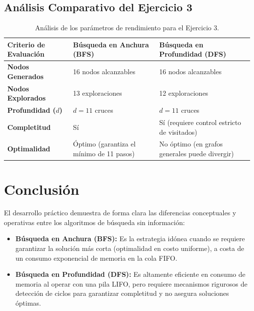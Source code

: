 \documentclass[11pt,letterpaper]{article}
\begin{document}
\subsection{Análisis Comparativo del Ejercicio 3}

\begin{table}[H]
\centering\small
\renewcommand{\arraystretch}{1.2}
\begin{tabularx}{\linewidth}{@{} l X X @{}}
\toprule
\textbf{Criterio de Evaluación} & \textbf{Búsqueda en Anchura (BFS)} & \textbf{Búsqueda en Profundidad (DFS)} \\
\midrule
\textbf{Nodos Generados} & 16 nodos alcanzables & 16 nodos alcanzables \\
\textbf{Nodos Explorados} & 13 exploraciones & 12 exploraciones \\
\textbf{Profundidad ($d$)} & $d = 11$ cruces & $d = 11$ cruces \\
\textbf{Completitud} & Sí & Sí (requiere control estricto de visitados) \\
\textbf{Optimalidad} & Óptimo (garantiza el mínimo de 11 pasos) & No óptimo (en grafos generales puede divergir) \\
\bottomrule
\end{tabularx}
\caption{Análisis de los parámetros de rendimiento para el Ejercicio 3.}
\end{table}

\section{Conclusión}

El desarrollo práctico demuestra de forma clara las diferencias conceptuales y operativas entre los algoritmos de búsqueda sin información:

\begin{itemize}
  \item \textbf{Búsqueda en Anchura (BFS):} Es la estrategia idónea cuando se requiere garantizar la solución más corta (optimalidad en costo uniforme), a costa de un consumo exponencial de memoria en la cola FIFO.
  \item \textbf{Búsqueda en Profundidad (DFS):} Es altamente eficiente en consumo de memoria al operar con una pila LIFO, pero requiere mecanismos rigurosos de detección de ciclos para garantizar completitud y no asegura soluciones óptimas.
\end{itemize}

\end{document}
